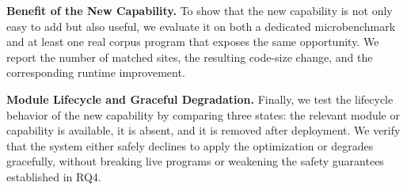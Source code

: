 \noindent\textbf{Benefit of the New Capability.}
To show that the new capability is not only easy to add but also useful, we evaluate it on both a dedicated microbenchmark and at least one real corpus program that exposes the same opportunity. We report the number of matched sites, the resulting code-size change, and the corresponding runtime improvement.


\noindent\textbf{Module Lifecycle and Graceful Degradation.}
Finally, we test the lifecycle behavior of the new capability by comparing three states: the relevant module or capability is available, it is absent, and it is removed after deployment. We verify that the system either safely declines to apply the optimization or degrades gracefully, without breaking live programs or weakening the safety guarantees established in RQ4.

